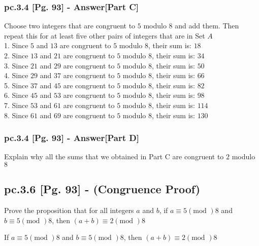 \subsubsection*{pc.3.4 [Pg. 93] - Answer[Part C]}
Choose two integers that are congruent to $5$ modulo $8$ and add them. Then repeat this for at least  five other pairs of integers that are in Set $A$ \\
1. Since $5$ and $13$ are congruent to $5$ modulo $8$, their sum is: $18$ \\
2. Since $13$ and $21$ are congruent to $5$ modulo $8$, their sum is: $34$ \\
3. Since $21$ and $29$ are congruent to $5$ modulo $8$, their sum is: $50$ \\
4. Since $29$ and $37$ are congruent to $5$ modulo $8$, their sum is: $66$ \\
5. Since $37$ and $45$ are congruent to $5$ modulo $8$, their sum is: $82$ \\
6. Since $45$ and $53$ are congruent to $5$ modulo $8$, their sum is: $98$ \\
7. Since $53$ and $61$ are congruent to $5$ modulo $8$, their sum is: $114$ \\
8. Since $61$ and $69$ are congruent to $5$ modulo $8$, their sum is: $130$ \\



\subsubsection*{pc.3.4 [Pg. 93] - Answer[Part D]}
Explain why all the sums that we obtained in Part C are congruent to $2$ modulo $8$


\subsection{pc.3.6 [Pg. 93] - (Congruence Proof)}
Prove the proposition that for all integers $a$ and $b$, if $a \equiv 5 (\text{mod }) 8$ and $b \equiv 5 (\text{mod }) 8$, then $(a+b) \equiv 2 (\text{mod }) 8$ \\

\begin{tcolorbox}
	\begin{theorem}
		If $a \equiv 5 (\text{mod })8$ and $b \equiv 5 (\text{mod })8$, then $(a + b) \equiv 2 (\text{mod })8$
	\end{theorem}
\end{tcolorbox}

